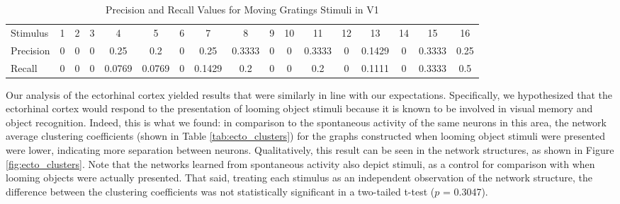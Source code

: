\documentclass{article}
\begin{document}
\begin{table}[ht]
  \centering
  \footnotesize
  
  \begin{tabular}{l|c|c|c|c|c|c|c|c|c|c|c|c|c|c|c|c}
    \hline
    Stimulus  & 1 & 2 & 3 & 4      & 5      & 6 & 7      & 8      & 9 & 10 & 11     & 12 & 13     & 14 & 15     & 16   \\
    Precision & 0 & 0 & 0 & 0.25   & 0.2    & 0 & 0.25   & 0.3333 & 0 & 0  & 0.3333 & 0  & 0.1429 & 0  & 0.3333 & 0.25 \\
    Recall    & 0 & 0 & 0 & 0.0769 & 0.0769 & 0 & 0.1429 & 0.2    & 0 & 0  & 0.2    & 0  & 0.1111 & 0  & 0.3333 & 0.5  \\
    \hline 
  \end{tabular}

  \caption{Precision and Recall Values for Moving Gratings Stimuli in V1}
  \label{tab:precision_recall}
\end{table}

Our analysis of the ectorhinal cortex yielded results that were similarly in 
line with our expectations. Specifically, we hypothesized that the ectorhinal 
cortex would respond to the presentation of looming object stimuli because it 
is known to be involved in visual memory and object recognition. Indeed, this 
is what we found: in comparison to the spontaneous activity of the same 
neurons in this area, the network average clustering coefficients (shown in 
Table \ref{tab:ecto_clusters}) for the graphs constructed when looming object 
stimuli were presented were lower, indicating more separation between neurons. 
Qualitatively, this result can be seen in the network structures, as shown in 
Figure \ref{fig:ecto_clusters}. Note that the networks learned from 
spontaneous activity also depict stimuli, as a control for comparison with 
when looming objects were actually presented. That said, treating each 
stimulus as an independent observation of the network structure, the 
difference between the clustering coefficients was not statistically 
significant in a two-tailed t-test ($p$ = 0.3047). \par
\end{document}
